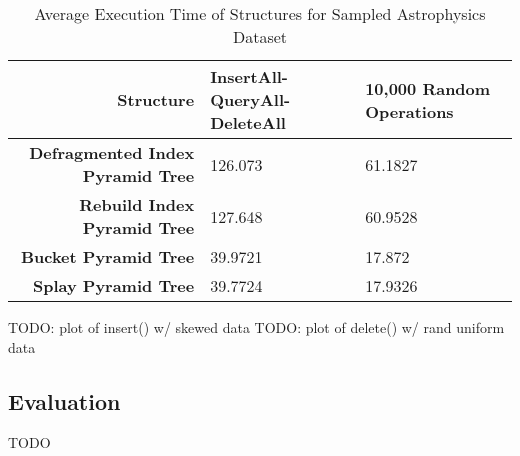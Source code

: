 \begin{landscape}
	\begin{table}
		\centering
		\begin{tabular}{|r|l|l|}
			\hline
			\textbf{Structure} & \textbf{InsertAll-QueryAll-DeleteAll} & \textbf{10,000 Random Operations} \\
			\hline
			\textbf{Defragmented Index Pyramid Tree} & 126.073 & 61.1827 \\
			\textbf{Rebuild Index Pyramid Tree} & 127.648 & 60.9528 \\
			\textbf{Bucket Pyramid Tree} & 39.9721 & 17.872 \\
			\textbf{Splay Pyramid Tree} & 39.7724 & 17.9326 \\
			\hline
		\end{tabular}
		\caption{Average Execution Time of Structures for Sampled Astrophysics Dataset}
		\label{tab:perf2-astrophysics}
	\end{table}

\end{landscape}

TODO: plot of insert() w/ skewed data
TODO: plot of delete() w/ rand uniform data

\subsection{Evaluation}

TODO
